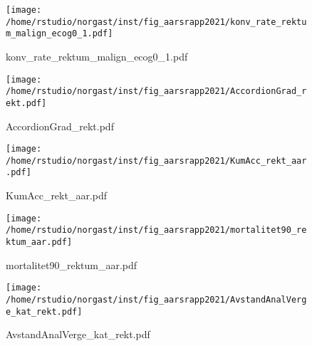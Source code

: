 \documentclass[norsk,a4paper]{article}\usepackage[]{graphicx}\usepackage[]{color}
\begin{document}
\begin{figure}[ht]
\centering
\texttt{[image: /home/rstudio/norgast/inst/fig\_aarsrapp2021/konv\_rate\_rektum\_malign\_ecog0\_1.pdf]}
\caption{konv\_rate\_rektum\_malign\_ecog0\_1.pdf}
\end{figure}

\begin{figure}[ht]
\centering
\texttt{[image: /home/rstudio/norgast/inst/fig\_aarsrapp2021/AccordionGrad\_rekt.pdf]}
\caption{AccordionGrad\_rekt.pdf}
\end{figure}

\begin{figure}[ht]
\centering
\texttt{[image: /home/rstudio/norgast/inst/fig\_aarsrapp2021/KumAcc\_rekt\_aar.pdf]}
\caption{KumAcc\_rekt\_aar.pdf}
\end{figure}


\begin{figure}[ht]
\centering
\texttt{[image: /home/rstudio/norgast/inst/fig\_aarsrapp2021/mortalitet90\_rektum\_aar.pdf]}
\caption{mortalitet90\_rektum\_aar.pdf}
\end{figure}

\begin{figure}[ht]
\centering
\texttt{[image: /home/rstudio/norgast/inst/fig\_aarsrapp2021/AvstandAnalVerge\_kat\_rekt.pdf]}
\caption{AvstandAnalVerge\_kat\_rekt.pdf}
\end{figure}
\end{document}
